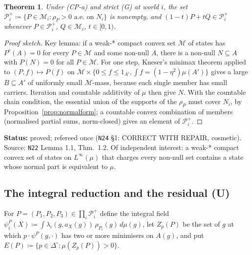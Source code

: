 \documentclass[11pt]{article}
\newtheorem{theorem}{Theorem}[section]
\theoremstyle{definition}
\theoremstyle{remark}
\newcommand{\Di}{\Delta^{\circ}}
\newcommand{\M}{\mathcal M}
\newcommand{\src}[1]{\texttt{#1}}
\newcommand{\status}[1]{\par\smallskip\noindent\textbf{Status:} #1\par\smallskip}
\begin{document}
\begin{theorem}\label{thm:fullsupport}
Under (CP-a) and strict (G) at world $i$, the set $\mathcal P^+_i\coloneqq\{P\in\M_i:\rho_P>0\text{ a.e.\ on }N_i\}$ is nonempty, and $(1-t)P+tQ\in\mathcal P^+_i$ whenever $P\in\mathcal P^+_i$, $Q\in\M_i$, $t\in[0,1)$.
\end{theorem}
\begin{proof}[Proof sketch]
Key lemma: if a weak-* compact convex set $\M$ of states has $P^c(A)=0$ for every $P\in\M$ and some non-null $A$, there is a non-null $N\subseteq A$ with $P(N)=0$ for all $P\in\M$. For one step, Kneser's minimax theorem applied to $(P,f)\mapsto P(f)$ on $\M\times\{0\le f\le1_{A'},\int f=(1-\eta^2)\mu(A')\}$ gives a large $B\subseteq A'$ of uniformly small $\M$-mass, because each single member has small carriers. Iteration and countable additivity of $\mu$ then give $N$. With the countable chain condition, the essential union of the supports of the $\rho_P$ must cover $N_i$, by Proposition~\ref{prop:normalform}; a countable convex combination of members (normalised partial sums, norm-closed) gives an element of $\mathcal P^+_i$.
\end{proof}
\status{proved; refereed once (\src{N24} \S1: CORRECT WITH REPAIR, cosmetic). Source: \src{N22} Lemma 1.1, Thm.~1.2. Of independent interest: a weak-* compact convex set of states on $L^\infty(\mu)$ that charges every non-null set contains a state whose normal part is equivalent to $\mu$.}

\subsection{The integral reduction and the residual (U)}

For $P=(P_1,P_2,P_3)\in\prod_i\mathcal P^+_i$ define the integral field $\psi^P_i(X)\coloneqq\int\lambda_i(g,a_X(g))\,\rho_{P_i}(g)\,d\mu(g)$, let $Z_p(P)$ be the set of $g$ at which $p\cdot\psi^P(g,\cdot)$ has two or more minimisers on $A(g)$, and put $E(P)\coloneqq\{p\in\Di:\mu(Z_p(P))>0\}$.
\end{document}
